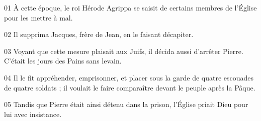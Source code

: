 01 À cette époque, le roi Hérode Agrippa se saisit de certains membres de l’Église pour les mettre à mal.

02 Il supprima Jacques, frère de Jean, en le faisant décapiter.

03 Voyant que cette mesure plaisait aux Juifs, il décida aussi d’arrêter Pierre. C’était les jours des Pains sans levain.

04 Il le fit appréhender, emprisonner, et placer sous la garde de quatre escouades de quatre soldats ; il voulait le faire comparaître devant le peuple après la Pâque.

05 Tandis que Pierre était ainsi détenu dans la prison, l’Église priait Dieu pour lui avec insistance.
